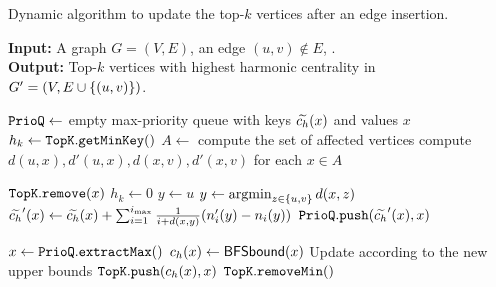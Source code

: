 \begin{algorithm}[tb]
\small
\caption{\small Dynamic \nbbound algorithm to update the
top-$k$ vertices after an edge insertion.}
\label{algo:nbbound-dyn-ins}
\textbf{Input:} A graph $G = (V, E)$, an edge $(u,v) \notin E$, \topk.\\
\textbf{Output:} Top-$k$ vertices with highest harmonic centrality in $G' = (V, E \cup \set{(u, v)})$.
\begin{algorithmic}[1]
\State$\texttt{PrioQ} \gets$ empty max-priority queue with keys $\widetilde{c_h}(x)$ and values $x$
\State$h_k \gets \texttt{TopK}.\texttt{getMinKey}()$
\State$A \gets $ compute the set of affected vertices\label{line:nbbound-dyn-ins-init1}
\State compute $d(u, x), d'(u, x), d(x, v), d'(x, v)$ for each $x\in A$
\label{line:nbbound-dyn-ins-init2}\smallskip

\label{line:nbbound-dyn-ins-loop}
\State$\texttt{TopK}.\texttt{remove}(x)$
\State$h_k \gets 0$
\EndIf
\State$y \gets u$
\State$y \gets \argmin_{z \in \set{u, v}}d(x, z)$
\EndIf
{}
\State$\widetilde{c_h}'(x) \gets \widetilde{c_h}(x) +
\sum_{i = 1}^{i_{\max}}\frac{1}{i + d(x, y)}(n_i'(y) - n_i(y))$
\label{line:nbbound-dyn-ins-upd-bound}
\State$\texttt{PrioQ}.\texttt{push}(\widetilde{c_h}'(x), x)$\smallskip
\EndFor

\label{line:nbbound-dyn-ins-resume1}
\State$x \gets \texttt{PrioQ}.\texttt{extractMax}()$
\State\Return\topk\label{line:nbbound-dyn-ins-early-stop}
\EndIf
\State$c_h(x) \gets \textsf{BFSbound}(x)$\label{line:nbbound-dyn-ins-bfsbound}
\State Update \prioq according to the new upper bounds
\State$\texttt{TopK}.\texttt{push}(c_h(x), x)$
\State$\texttt{TopK}.\texttt{removeMin}()$
\EndIf
\EndWhile
\State\Return\topk
\label{line:nbbound-dyn-ins-loop-end}
\end{algorithmic}
\end{algorithm}
